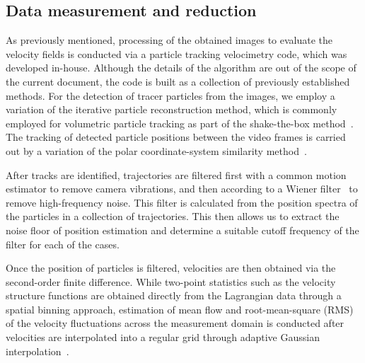 \documentclass[aps,prfluids,groupedaddress,showkeys,11pt,tightenlines]{revtex4-2}
\begin{document}
\subsection{Data measurement and reduction\label{sec:ptv}}

As previously mentioned, processing of the obtained images to evaluate the velocity fields is conducted via a particle tracking velocimetry code, which was developed in-house. Although the details of the algorithm are out of the scope of the current document, the code is built as a collection of previously established methods. For the detection of tracer particles from the images, we employ a variation of the iterative particle reconstruction method, which is commonly employed for volumetric particle tracking as part of the shake-the-box method~\cite{ipr_jahn2021}. The tracking of detected particle positions between the video frames is carried out by a variation of the polar coordinate-system similarity method~\cite{PCSSimproved}.

After tracks are identified, trajectories are filtered first with a common motion estimator to remove camera vibrations, and then according to a Wiener filter~\cite{wiener1949extrapolation} to remove high-frequency noise. This filter is calculated from the position spectra of the particles in a collection of trajectories. This then allows us to extract the noise floor of position estimation and determine a suitable cutoff frequency of the filter for each of the cases. 

Once the position of particles is filtered, velocities are then obtained via the second-order finite difference. While two-point statistics such as the velocity structure functions are obtained directly from the Lagrangian data through a spatial binning approach, estimation of mean flow and root-mean-square (RMS) of the velocity fluctuations across the measurement domain is conducted after velocities are interpolated into a regular grid through adaptive Gaussian interpolation~\cite{agui_performance_1987}.
\end{document}
